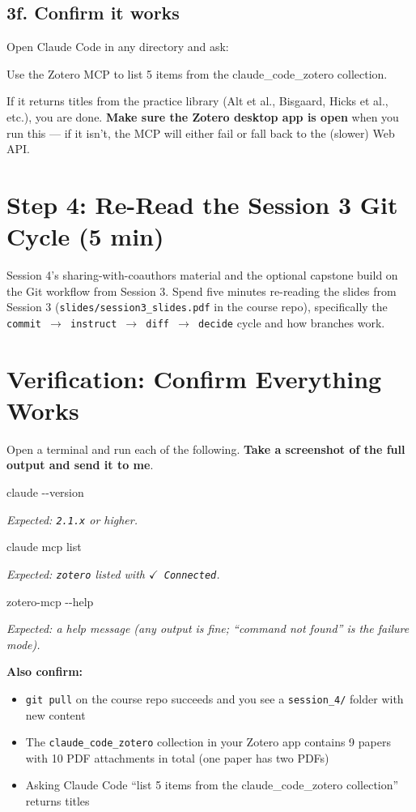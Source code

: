 \documentclass[11pt]{article}
\newcommand{\cmd}[1]{\par\vspace{0.2em}\colorbox{codegray}{\parbox{\dimexpr\linewidth-2\fboxsep}{\ttfamily\small #1}}\par\vspace{0.2em}}
\begin{document}
\subsection*{3f. Confirm it works}

Open Claude Code in any directory and ask:
\cmd{Use the Zotero MCP to list 5 items from the claude\_code\_zotero collection.}

If it returns titles from the practice library (Alt et al., Bisgaard, Hicks et al., etc.), you are done. \textbf{Make sure the Zotero desktop app is open} when you run this --- if it isn't, the MCP will either fail or fall back to the (slower) Web API.

\section*{Step 4: Re-Read the Session 3 Git Cycle (5 min)}

Session 4's sharing-with-coauthors material and the optional capstone build on the Git workflow from Session 3. Spend five minutes re-reading the slides from Session 3 (\texttt{slides/session3\_slides.pdf} in the course repo), specifically the \texttt{commit $\rightarrow$ instruct $\rightarrow$ diff $\rightarrow$ decide} cycle and how branches work.

\section*{Verification: Confirm Everything Works}

Open a terminal and run each of the following. \textbf{Take a screenshot of the full output and send it to me}.

\cmd{claude -\/-version}
\textit{Expected: \texttt{2.1.x} or higher.}

\cmd{claude mcp list}
\textit{Expected: \texttt{zotero} listed with \texttt{$\checkmark$ Connected}.}

\cmd{zotero-mcp -\/-help}
\textit{Expected: a help message (any output is fine; ``command not found'' is the failure mode).}

\textbf{Also confirm:}
\begin{itemize}[leftmargin=2em,itemsep=0pt]
  \item \texttt{git pull} on the course repo succeeds and you see a \texttt{session\_4/} folder with new content
  \item The \texttt{claude\_code\_zotero} collection in your Zotero app contains 9 papers with 10 PDF attachments in total (one paper has two PDFs)
  \item Asking Claude Code ``list 5 items from the claude\_code\_zotero collection'' returns titles
\end{itemize}
\end{document}
